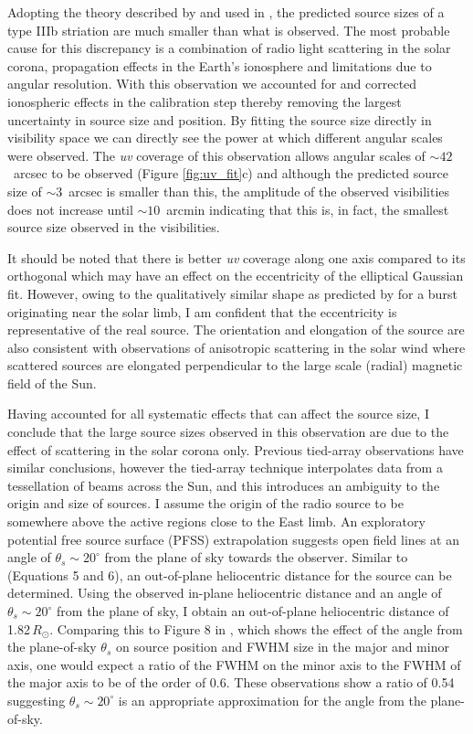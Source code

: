 Adopting the theory described by \cite{Takakura1975} and used in \cite{Kontar2017}, the predicted source sizes of a type IIIb striation are much smaller than what is observed. The most probable cause for this discrepancy is a combination of radio light scattering in the solar corona, propagation effects in the Earth's ionosphere and limitations due to angular resolution.
With this observation we accounted for and corrected ionospheric effects in the calibration step \citep[Section \ref{sec:data} and ][]{DeGasperin2019} thereby removing the largest uncertainty in source size and position. By fitting the source size directly in visibility space we can directly see the power at which different angular scales were observed. The \textit{uv} coverage of this observation allows angular scales of ${\sim} 42$~arcsec to be observed (Figure \ref{fig:uv_fit}c) and although the predicted source size of ${\sim}3$~arcsec is smaller than this, the amplitude of the observed visibilities does not increase until ${\sim} 10$~arcmin indicating that this is, in fact, the smallest source size observed in the visibilities.

It should be noted that there is better \textit{uv} coverage along one axis compared to its orthogonal which may have an effect on the eccentricity of the elliptical Gaussian fit. However, owing to the qualitatively similar shape as predicted by \cite{Kontar2019} for a burst originating near the solar limb, I am confident that the eccentricity is representative of the real source. The orientation and elongation of the source are also consistent with observations of anisotropic scattering in the solar wind \citep{Anantharamaiah1994, Ingale2015} where scattered sources are elongated perpendicular to the large scale (radial) magnetic field of the Sun.

Having accounted for all systematic effects that can affect the source size, I conclude that the large source sizes observed in this observation are due to the effect of scattering in the solar corona only. Previous tied-array observations have similar conclusions, however the tied-array technique interpolates data from a tessellation of beams across the Sun, and this introduces an ambiguity to the origin and size of sources. 
I assume the origin of the radio source to be somewhere above the active regions close to the East limb. 
An exploratory potential free source surface (PFSS) extrapolation suggests open field lines at an angle of $ \theta_s {\sim} 20^\circ$ from the plane of sky towards the observer. Similar to \cite{Chrysaphi2018} (Equations 5 and 6), an out-of-plane heliocentric distance for the source can be determined. Using the observed in-plane heliocentric distance and an angle of $ \theta_s {\sim} 20^\circ$ from the plane of sky, I obtain an out-of-plane heliocentric distance of 1.82$\, R_\odot$. Comparing this to Figure 8 in \cite{Kontar2019}, which shows the effect of the angle from the plane-of-sky $\theta_s$ on source position and FWHM size in the major and minor axis, one would expect a ratio of the FWHM on the minor axis to the FWHM of the major axis to be of the order of 0.6. These observations show a ratio of 0.54 suggesting $ \theta_s {\sim} 20^\circ$ is an appropriate approximation for the angle from the plane-of-sky.

